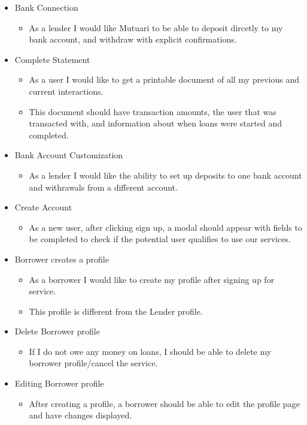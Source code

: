 \begin{itemize}
	\item Bank Connection
	\begin{itemize}
		\item As a lender I would like Mutuari to be able to deposit dircetly to my bank account, and withdraw with explicit confirmations.
	\end{itemize}

	\item Complete Statement
	\begin{itemize}
		\item As a user I would like to get a printable document of all my previous and current interactions.
		\item This document should have transaction amounts, the user that was transacted with, and information about when loans were started and completed.
	\end{itemize}

	\item Bank Account Customization
	\begin{itemize}
		\item As a lender I would like the ability to set up deposits to one bank account and withrawals from a different account.
	\end{itemize}

	\item Create Account
	\begin{itemize}
		\item As a new user, after clicking sign up, a modal should appear with fields to be completed to check if the potential user qualifies to use our services.
	\end{itemize}

	\item Borrower creates a profile
	\begin{itemize}
		\item As a borrower I would like to create my profile after signing up for service.
		\item This profile is different from the Lender profile.
	\end{itemize}

	\item Delete Borrower profile
	\begin{itemize}
		\item If I do not owe any money on loans, I should be able to delete my borrower profile/cancel the service.
	\end{itemize}

	\item Editing Borrower profile
	\begin{itemize}
		\item After creating a profile, a borrower should be able to edit the profile page and have changes displayed.
	\end{itemize}


\end{itemize}
